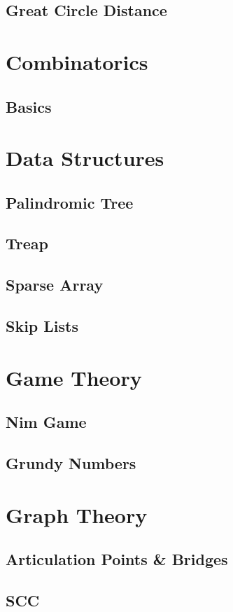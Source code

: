 \documentclass[twocolumn]{article}
\begin{document}
		\subsection{Great Circle Distance}
	\section{Combinatorics}
		\subsection{Basics}
			
	\section{Data Structures}
		\subsection{Palindromic Tree}
		\subsection{Treap}
		\subsection{Sparse Array}
		\subsection{Skip Lists}
	\section{Game Theory}
		\subsection{Nim Game}
		\subsection{Grundy Numbers}
	\section{Graph Theory}
		\subsection{Articulation Points \& Bridges}
		\subsection{SCC}
\end{document}
